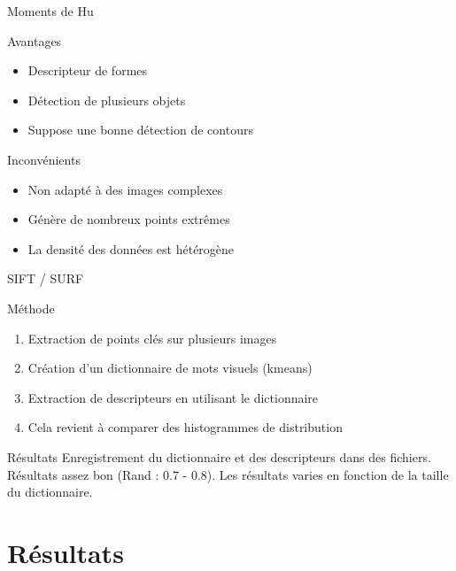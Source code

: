\documentclass[xcolor=table]{beamer}
\begin{document}
	\begin{frame}{Moments de Hu}
		\begin{block}{Avantages}
			\begin{itemize}
				\item Descripteur de formes
				\item Détection de plusieurs objets
				\item Suppose une bonne détection de contours
			\end{itemize}
		\end{block}
		\begin{block}{Inconvénients}
			\begin{itemize}
				\item Non adapté à des images complexes
				\item Génère de nombreux points extrêmes
				\item La densité des données est hétérogène
			\end{itemize}
		\end{block}
	\end{frame}

	\begin{frame}{SIFT / SURF}
		\begin{block}{Méthode}
			\begin{enumerate}
				\item Extraction de points clés sur plusieurs images
				\item Création d'un dictionnaire de mots visuels (kmeans)
				\item Extraction de descripteurs en utilisant le dictionnaire
				\item Cela revient à comparer des histogrammes de distribution
			\end{enumerate}
		\end{block}
		\begin{block}{Résultats}
			Enregistrement du dictionnaire et des descripteurs dans des fichiers.\\
			Résultats assez bon (Rand : 0.7 - 0.8). Les résultats varies en fonction de la taille du dictionnaire.
		\end{block}
	\end{frame}


\section{Résultats}
\end{document}

